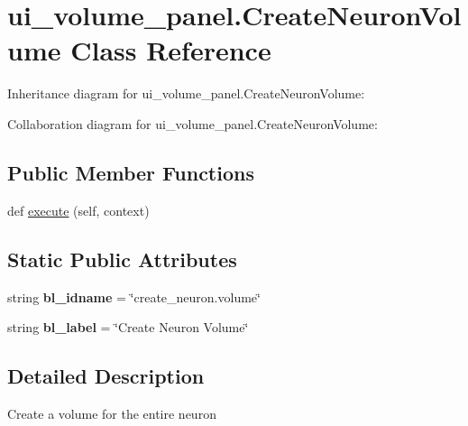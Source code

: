 \hypertarget{classui__volume__panel_1_1CreateNeuronVolume}{}\section{ui\+\_\+volume\+\_\+panel.\+Create\+Neuron\+Volume Class Reference}
\label{classui__volume__panel_1_1CreateNeuronVolume}


Inheritance diagram for ui\+\_\+volume\+\_\+panel.\+Create\+Neuron\+Volume\+:


Collaboration diagram for ui\+\_\+volume\+\_\+panel.\+Create\+Neuron\+Volume\+:
\subsection*{Public Member Functions}
\begin{DoxyCompactItemize}
\item 
def \hyperlink{classui__volume__panel_1_1CreateNeuronVolume_adadae8e07cab08db6daac1ca5cb21944}{execute} (self, context)
\end{DoxyCompactItemize}
\subsection*{Static Public Attributes}
\begin{DoxyCompactItemize}
\item 
string {\bfseries bl\+\_\+idname} = \char`\"{}create\+\_\+neuron.\+volume\char`\"{}\hypertarget{classui__volume__panel_1_1CreateNeuronVolume_aada1e79288fca58ad4e97def750217ea}{}\label{classui__volume__panel_1_1CreateNeuronVolume_aada1e79288fca58ad4e97def750217ea}

\item 
string {\bfseries bl\+\_\+label} = \char`\"{}Create Neuron Volume\char`\"{}\hypertarget{classui__volume__panel_1_1CreateNeuronVolume_a5b68225b806452866509f06484fa180d}{}\label{classui__volume__panel_1_1CreateNeuronVolume_a5b68225b806452866509f06484fa180d}

\end{DoxyCompactItemize}


\subsection{Detailed Description}
\begin{DoxyVerb}Create a volume for the entire neuron\end{DoxyVerb}
 

